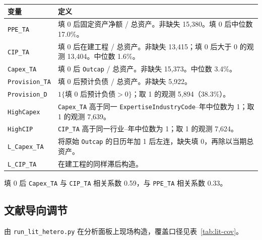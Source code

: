 \documentclass[11pt]{article}
\begin{document}
\begin{center}
\begin{threeparttable}
\caption{财务调节变量}
\label{tab:fin-vars}
\begin{tabular}{lp{10.4cm}}
\toprule
变量 & 定义 \\
\midrule
\texttt{PPE\_TA} & 填 0 后固定资产净额 / 总资产。非缺失 15,380。填 0 后中位数 17.0\%。 \\
\texttt{CIP\_TA} & 填 0 后在建工程 / 总资产。非缺失 13,415；填 0 后大于 0 的观测 13,404。中位数 1.6\%。 \\
\texttt{Capex\_TA} & 填 0 后 \texttt{Outcap} / 总资产。非缺失 15,373。中位数 3.4\%。 \\
\texttt{Provision\_TA} & 填 0 后预计负债 / 总资产。非缺失 5,922。 \\
\texttt{Provision\_D} & \(1\{\text{填 0 后预计负债}>0\}\)；取 1 的观测 5,894（38.3\%）。 \\
\texttt{HighCapex} & \texttt{Capex\_TA} 高于同一 \texttt{ExpertiseIndustryCode}--年中位数为 1；取 1 的观测 7,639。 \\
\texttt{HighCIP} & \texttt{CIP\_TA} 高于同一行业--年中位数为 1；取 1 的观测 7,624。 \\
\texttt{L\_Capex\_TA} & 将原始 \texttt{Outcap} 的日历年加 1 后左连，缺失填 0，再除以当期总资产。 \\
\texttt{L\_CIP\_TA} & 在建工程的同样滞后构造。 \\
\bottomrule
\end{tabular}
\begin{tablenotes}\footnotesize
\item 填 0 后 \texttt{Capex\_TA} 与 \texttt{CIP\_TA} 相关系数 0.59，与 \texttt{PPE\_TA} 相关系数 0.33。
\end{tablenotes}
\end{threeparttable}
\end{center}

\subsection{文献导向调节}

由 \texttt{run\_lit\_hetero.py} 在分析面板上现场构造，覆盖口径见表~\ref{tab:lit-cov}。
\end{document}
